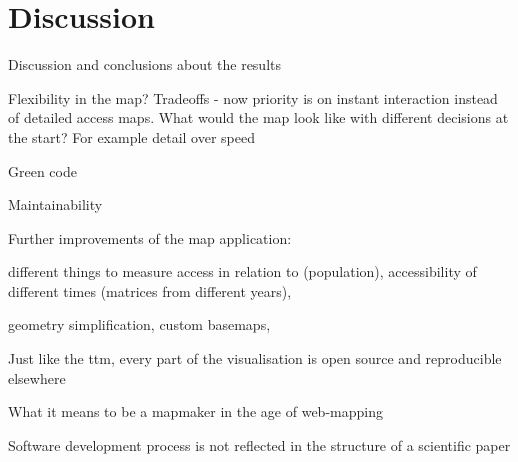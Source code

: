\section{Discussion}

Discussion and conclusions about the results

Flexibility in the map? Tradeoffs - now priority is on instant interaction instead of detailed access maps.
What would the map look like with different decisions at the start? For example detail over speed

Green code

Maintainability

Further improvements of the map application:

different things to measure access in relation to (population),
accessibility of different times (matrices from different years),

geometry simplification,
custom basemaps,

Just like the \acrshort{ttm}, every part of the visualisation is open source and reproducible elsewhere

What it means to be a mapmaker in the age of web-mapping

Software development process is not reflected in the structure of a scientific paper
